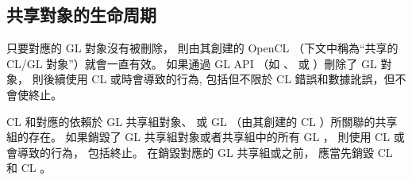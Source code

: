 \subsection{共享對象的生命周期}

只要對應的 GL 對象沒有被刪除，
則由其創建的 OpenCL （下文中稱為“共享的 CL/GL 對象”）就會一直有效。
如果通過 GL API （如 、  或 ）刪除了 GL 對象，
則後續使用 CL 或時會導致的行為,
包括但不限於 CL 錯誤和數據訛誤，但不會使終止。

CL 和對應的依賴於 GL 共享組對象、
或 GL （由其創建的 CL ）所關聯的共享組的存在。
如果銷毀了 GL 共享組對象或者共享組中的所有 GL ，
則使用 CL 或會導致的行為，
包括終止。
在銷毀對應的 GL 共享組或之前，
應當先銷毀 CL 和 CL 。

